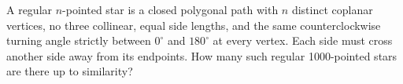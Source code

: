A regular $n$-pointed star is a closed polygonal path with $n$ distinct coplanar vertices, no three collinear, equal side lengths, and the same counterclockwise turning angle strictly between $0^\circ$ and $180^\circ$ at every vertex. Each side must cross another side away from its endpoints. How many such regular 1000-pointed stars are there up to similarity?
